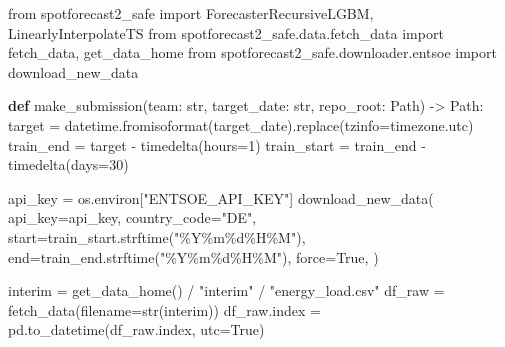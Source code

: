 \documentclass[
  english,
  letterpaper,
]{scrbook}
\newenvironment{Shaded}{\begin{snugshade}}{\end{snugshade}}
\newcommand{\BuiltInTok}[1]{\textcolor[rgb]{0.00,0.23,0.31}{#1}}
\newcommand{\DecValTok}[1]{\textcolor[rgb]{0.68,0.00,0.00}{#1}}
\newcommand{\ImportTok}[1]{\textcolor[rgb]{0.00,0.46,0.62}{#1}}
\newcommand{\KeywordTok}[1]{\textcolor[rgb]{0.00,0.23,0.31}{\textbf{#1}}}
\newcommand{\NormalTok}[1]{\textcolor[rgb]{0.00,0.23,0.31}{#1}}
\newcommand{\OperatorTok}[1]{\textcolor[rgb]{0.37,0.37,0.37}{#1}}
\newcommand{\SpecialCharTok}[1]{\textcolor[rgb]{0.37,0.37,0.37}{#1}}
\newcommand{\StringTok}[1]{\textcolor[rgb]{0.13,0.47,0.30}{#1}}
\newcommand{\VariableTok}[1]{\textcolor[rgb]{0.07,0.07,0.07}{#1}}
\begin{document}
\begin{Shaded}
\begin{Highlighting}[]
\ImportTok{from}\NormalTok{ spotforecast2\_safe }\ImportTok{import}\NormalTok{ ForecasterRecursiveLGBM, LinearlyInterpolateTS}
\ImportTok{from}\NormalTok{ spotforecast2\_safe.data.fetch\_data }\ImportTok{import}\NormalTok{ fetch\_data, get\_data\_home}
\ImportTok{from}\NormalTok{ spotforecast2\_safe.downloader.entsoe }\ImportTok{import}\NormalTok{ download\_new\_data}


\KeywordTok{def}\NormalTok{ make\_submission(team: }\BuiltInTok{str}\NormalTok{, target\_date: }\BuiltInTok{str}\NormalTok{, repo\_root: Path) }\OperatorTok{{-}\textgreater{}}\NormalTok{ Path:}
\NormalTok{    target }\OperatorTok{=}\NormalTok{ datetime.fromisoformat(target\_date).replace(tzinfo}\OperatorTok{=}\NormalTok{timezone.utc)}
\NormalTok{    train\_end }\OperatorTok{=}\NormalTok{ target }\OperatorTok{{-}}\NormalTok{ timedelta(hours}\OperatorTok{=}\DecValTok{1}\NormalTok{)}
\NormalTok{    train\_start }\OperatorTok{=}\NormalTok{ train\_end }\OperatorTok{{-}}\NormalTok{ timedelta(days}\OperatorTok{=}\DecValTok{30}\NormalTok{)}

\NormalTok{    api\_key }\OperatorTok{=}\NormalTok{ os.environ[}\StringTok{"ENTSOE\_API\_KEY"}\NormalTok{]}
\NormalTok{    download\_new\_data(}
\NormalTok{        api\_key}\OperatorTok{=}\NormalTok{api\_key,}
\NormalTok{        country\_code}\OperatorTok{=}\StringTok{"DE"}\NormalTok{,}
\NormalTok{        start}\OperatorTok{=}\NormalTok{train\_start.strftime(}\StringTok{"\%Y\%m}\SpecialCharTok{\%d}\StringTok{\%H\%M"}\NormalTok{),}
\NormalTok{        end}\OperatorTok{=}\NormalTok{train\_end.strftime(}\StringTok{"\%Y\%m}\SpecialCharTok{\%d}\StringTok{\%H\%M"}\NormalTok{),}
\NormalTok{        force}\OperatorTok{=}\VariableTok{True}\NormalTok{,}
\NormalTok{    )}

\NormalTok{    interim }\OperatorTok{=}\NormalTok{ get\_data\_home() }\OperatorTok{/} \StringTok{"interim"} \OperatorTok{/} \StringTok{"energy\_load.csv"}
\NormalTok{    df\_raw }\OperatorTok{=}\NormalTok{ fetch\_data(filename}\OperatorTok{=}\BuiltInTok{str}\NormalTok{(interim))}
\NormalTok{    df\_raw.index }\OperatorTok{=}\NormalTok{ pd.to\_datetime(df\_raw.index, utc}\OperatorTok{=}\VariableTok{True}\NormalTok{)}


\end{Highlighting}
\end{Shaded}
\end{document}
